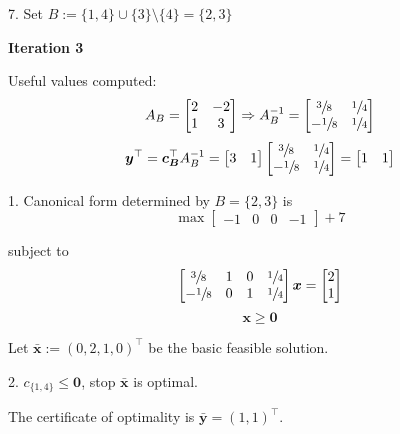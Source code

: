 \begin{exbox}
\begin{example}
        7. Set $ B:=\{1,4\}\cup \{3\}\setminus\{4\}=\{2,3\} $

        \textbf{Iteration 3}

        Useful values computed:
        \[ A_B=
            \begin{bmatrix}
                2 & -2 \\
                1 & 3  \\
            \end{bmatrix} \Rightarrow
            A_B^{-1}=
            \begin{bmatrix}
                \sfrac{3}{8}  & \sfrac{1}{4} \\
                -\sfrac{1}{8} & \sfrac{1}{4}
            \end{bmatrix} \]
        \[ \bm{y}^\top=\bm{c_B}^\top A_B^{-1}=
            \begin{bmatrix}
                3 & 1
            \end{bmatrix}
            \begin{bmatrix}
                \sfrac{3}{8}  & \sfrac{1}{4} \\
                -\sfrac{1}{8} & \sfrac{1}{4}
            \end{bmatrix}=
            \begin{bmatrix}
                1 & 1
            \end{bmatrix}\]

        1. Canonical form determined by $ B=\{2,3\} $ is
        \[ \max
            \begin{bmatrix}
                -1 & 0 & 0 & -1
            \end{bmatrix} + 7\]

        subject to
        \[
            \begin{bmatrix}
                \sfrac{3}{8}  & 1 & 0 & \sfrac{1}{4} \\
                -\sfrac{1}{8} & 0 & 1 & \sfrac{1}{4}
            \end{bmatrix}\bm{x}=
            \begin{bmatrix}
                2 \\
                1
            \end{bmatrix}\]
        \[ \bm{x}\geqslant  \bm{0} \]

        Let $ \bm{\bar{x}}:=(0,2,1,0)^\top $ be the basic feasible solution.

        2. $ c_{\{1,4\}}\leqslant \bm{0} $, stop $ \bm{\bar{x}} $ is optimal.

        The certificate of optimality is $ \bm{\bar{y}}=(1,1)^\top $.


\end{example}
\end{exbox}

